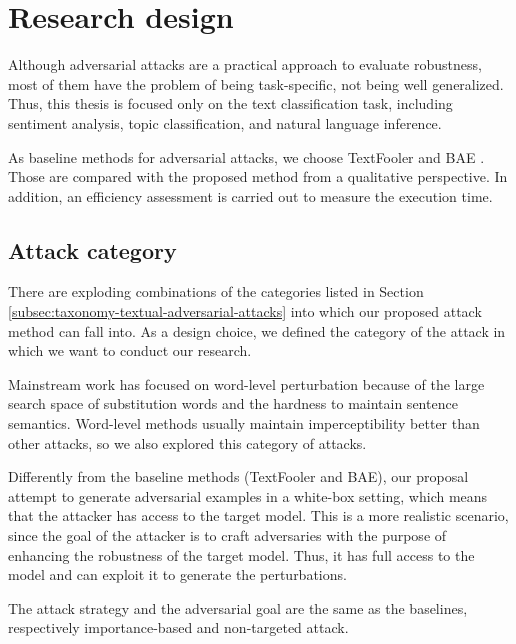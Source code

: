 \section{Research design}\label{sec:research-design}

Although adversarial attacks are a practical approach to evaluate robustness, most of them have the problem of being task-specific, not being well generalized.
Thus, this thesis is focused only on the text classification task, including sentiment analysis, topic classification, and natural language inference.

As baseline methods for adversarial attacks, we choose TextFooler \cite{journals/corr/abs-1907-11932} and BAE \cite{conf/emnlp/GargR20}.
Those are compared with the proposed method from a qualitative perspective. In addition, an efficiency assessment is carried out to measure the execution time.

\subsection{Attack category}\label{subsec:attack-category}

There are exploding combinations of the categories listed in Section \ref{subsec:taxonomy-textual-adversarial-attacks} into which our proposed attack method can fall into.
As a design choice, we defined the category of the attack in which we want to conduct our research.

Mainstream work has focused on word-level perturbation because of the large search space of substitution words and the hardness to maintain sentence semantics. 
Word-level methods usually maintain imperceptibility better than other attacks, so we also explored this category of attacks.

Differently from the baseline methods (TextFooler and BAE), our proposal attempt to generate adversarial examples in a white-box setting, which means that the attacker has access to the target model. 
This is a more realistic scenario, since the goal of the attacker is to craft adversaries with the purpose of enhancing the robustness of the target model. 
Thus, it has full access to the model and can exploit it to generate the perturbations.

The attack strategy and the adversarial goal are the same as the baselines, respectively importance-based and non-targeted attack.

